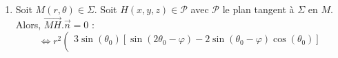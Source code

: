 \begin{enumerate}
\begin{enumerate}
\[\begin{array}{c}
                    \end{array}
                  \right)
                \]
                \[
                  \overrightarrow{n} =
                  \left(
                  \begin{array}{c}
                      3r_0^{2}\sin{(2\theta_0 - \varphi)}\sin{(\theta_0)} - 6\sin{(\theta_0)}\sin{(\theta_0 - \varphi)}r_0 \times r_0\cos{(\theta_0)}      \\
                      6\sin{(\theta_0)}\sin{(\theta_0 - \varphi)}r_0 \times  r_0\sin{(\theta_0)} + r_0\cos{(\theta_0)} 3r_0^{2}\sin{(2\theta_0 - \varphi)} \\
                      r_0\cos^{2}{(\theta_0)} + r_0\sin^{2}{(\theta_0)}                                                                                    \\
                    \end{array}
                  \right)
                \]
                \[
                  \overrightarrow{n} = r_0^{2}
                  \left(
                  \begin{array}{c}
                      3\sin{(\theta_0)}\left[ \sin{(2\theta_0 - \varphi)} - 2\sin{(\theta_0 - \varphi)}\cos{(\theta_0)}\right]       \\
                      3\left[ 2\sin^{2}{(\theta_0)}\sin{(\theta_0 - \varphi)} + \cos{(\theta_0)} \sin{(2\theta_0 - \varphi)} \right] \\
                      1                                                                                                              \\
                    \end{array}
                  \right)
                \]
                Alors $\overrightarrow{n} = 0$ pour $r = 0$
                Ainsi le seul point non régulier de $\Sigma$ est $O$.
                \begin{result}
                  L'ensemble des points non réguliers de $\Sigma$ est le point $O(0, 0, 0)$
                \end{result}
          \item
                Soit $M(r, \theta)\in\Sigma$. Soit $H(x, y, z)\in\mathcal{P}$ avec $\mathcal{P}$ le plan tangent à $\Sigma$ en $M$.
                Alors, $\overrightarrow{MH}.\overrightarrow{n} = 0$ :
                \[
                  \iff r^{2}
                  \left(
                  \begin{array}{c}
                      3\sin{(\theta_0)}\left[ \sin{(2\theta_0 - \varphi)} - 2\sin{(\theta_0 - \varphi)}\cos{(\theta_0)}\right]       \\

\end{array}\]
\end{enumerate}
\end{enumerate}
